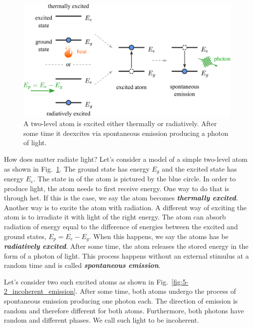 \begin{figure}
    \centering
    \includegraphics[width=\textwidth]{lesson5/5-2_spontaneous_emission.pdf}
    \caption[Spontaneous emission]{A two-level atom is excited either thermally or radiatively. After some time it deexcites via spontaneous emission producing a photon of light.}
    \label{fig:5-2_spontaneous_emission}
\end{figure}

How does matter radiate light?
Let's consider a model of a simple two-level atom as shown in Fig.~\ref{fig:5-2_spontaneous_emission}.
The ground state has energy $E_g$ and the excited state has energy $E_e$.
The state in of the atom is pictured by the blue circle.
In order to produce light, the atom needs to first receive energy.
One way to do that is through het.
If this is the case, we say the atom becomes \textit{\textbf{thermally excited}}.
Another way is to excite the atom with radiation.
A different way of exciting the atom is to irradiate it with light of the right energy.
The atom can absorb radiation of energy equal to the difference of energies between the excited and ground states, $E_p = E_e - E_g$.
When this happens, we say the atoms has be \textit{\textbf{radiatively excited}}.
After some time, the atom releases the stored energy in the form of a photon of light.
This process happens without an external stimulus at a random time and is called \textit{\textbf{spontaneous emission}}.

Let's consider two such excited atoms as shown in Fig.~\ref{fig:5-2_incoherent_emission}.
After some time, both atoms undergo the process of spontaneous emission producing one photon each.
The direction of emission is random and therefore different for both atoms.
Furthermore, both photons have random and different phases.
We call such light to be incoherent.

